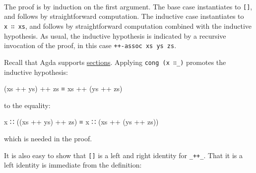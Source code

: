 \begin{fence}
\begin{code}
\AgdaOperator{\AgdaFunction{++}}\AgdaSpace{}%
\AgdaSymbol{))}\<%
\\
%
\>[2]\<%
\\
\>[2][@{}l@{\AgdaIndent{0}}]%
\>[4]\AgdaSpace{}%
\AgdaSpace{}%
\AgdaSpace{}%
\AgdaOperator{\AgdaFunction{++}}\AgdaSpace{}%
\AgdaSymbol{(}\AgdaSpace{}%
\AgdaOperator{\AgdaFunction{++}}\AgdaSpace{}%
\AgdaSymbol{)}\<%
\\
%
\>[2]\<%
\end{code}
\end{fence}

The proof is by induction on the first argument. The base case
instantiates to \texttt{{[}{]}}, and follows by straightforward
computation. The inductive case instantiates to \texttt{x\ ∷\ xs}, and
follows by straightforward computation combined with the inductive
hypothesis. As usual, the inductive hypothesis is indicated by a
recursive invocation of the proof, in this case
\texttt{++-assoc\ xs\ ys\ zs}.

Recall that Agda supports
\protect\hyperlink{Induction-sections}{sections}. Applying
\texttt{cong\ (x\ ∷\_)} promotes the inductive hypothesis:

\begin{myDisplay}
(xs ++ ys) ++ zs ≡ xs ++ (ys ++ zs)
\end{myDisplay}

to the equality:

\begin{myDisplay}
x ∷ ((xs ++ ys) ++ zs) ≡ x ∷ (xs ++ (ys ++ zs))
\end{myDisplay}

which is needed in the proof.

It is also easy to show that \texttt{{[}{]}} is a left and right
identity for \texttt{\_++\_}. That it is a left identity is immediate
from the definition:

